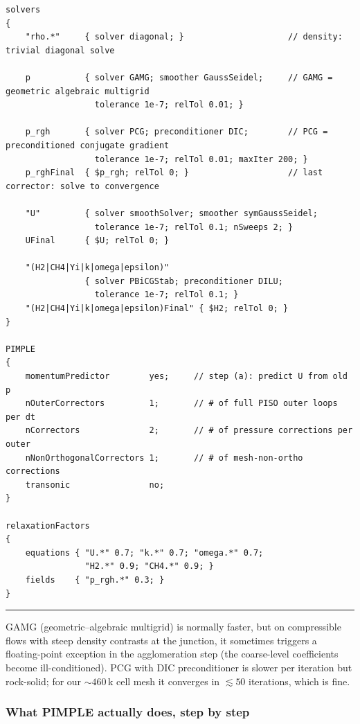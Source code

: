 \documentclass[11pt,a4paper]{article}
\newenvironment{whybox}[1][]{%
    \par\medskip\noindent
    \begin{list}{}{%
        \setlength{\leftmargin}{1.4em}%
        \setlength{\rightmargin}{0pt}%
        \setlength{\topsep}{0pt}%
    }\item[]%
    \textcolor{blue!50!black}{\rule[-0.4em]{2.5pt}{1.0em}}%
    \hspace{0.6em}{\sffamily\bfseries\color{blue!50!black}#1}\par\smallskip
}{%
    \end{list}\medskip
}
\begin{document}
\begin{lstlisting}[style=foamstyle,caption={\texttt{system/fvSolution} (annotated extract)}]
solvers
{
    "rho.*"     { solver diagonal; }                     // density: trivial diagonal solve

    p           { solver GAMG; smoother GaussSeidel;     // GAMG = geometric algebraic multigrid
                  tolerance 1e-7; relTol 0.01; }

    p_rgh       { solver PCG; preconditioner DIC;        // PCG = preconditioned conjugate gradient
                  tolerance 1e-7; relTol 0.01; maxIter 200; }
    p_rghFinal  { $p_rgh; relTol 0; }                    // last corrector: solve to convergence

    "U"         { solver smoothSolver; smoother symGaussSeidel;
                  tolerance 1e-7; relTol 0.1; nSweeps 2; }
    UFinal      { $U; relTol 0; }

    "(H2|CH4|Yi|k|omega|epsilon)"
                { solver PBiCGStab; preconditioner DILU;
                  tolerance 1e-7; relTol 0.1; }
    "(H2|CH4|Yi|k|omega|epsilon)Final" { $H2; relTol 0; }
}

PIMPLE
{
    momentumPredictor        yes;     // step (a): predict U from old p
    nOuterCorrectors         1;       // # of full PISO outer loops per dt
    nCorrectors              2;       // # of pressure corrections per outer
    nNonOrthogonalCorrectors 1;       // # of mesh-non-ortho corrections
    transonic                no;
}

relaxationFactors
{
    equations { "U.*" 0.7; "k.*" 0.7; "omega.*" 0.7;
                "H2.*" 0.9; "CH4.*" 0.9; }
    fields    { "p_rgh.*" 0.3; }
}
\end{lstlisting}

\begin{whybox}[Why PCG/DIC for $p_\mathrm{rgh}$ instead of GAMG?]
GAMG (geometric--algebraic multigrid) is normally faster, but on
compressible flows with steep density contrasts at the junction, it
sometimes triggers a floating-point exception in the agglomeration
step (the coarse-level coefficients become ill-conditioned). PCG
with DIC preconditioner is slower per iteration but rock-solid;
for our $\sim 460$\,k cell mesh it converges in
$\lesssim 50$ iterations, which is fine.
\end{whybox}

\subsubsection{What PIMPLE actually does, step by step}
\end{document}
